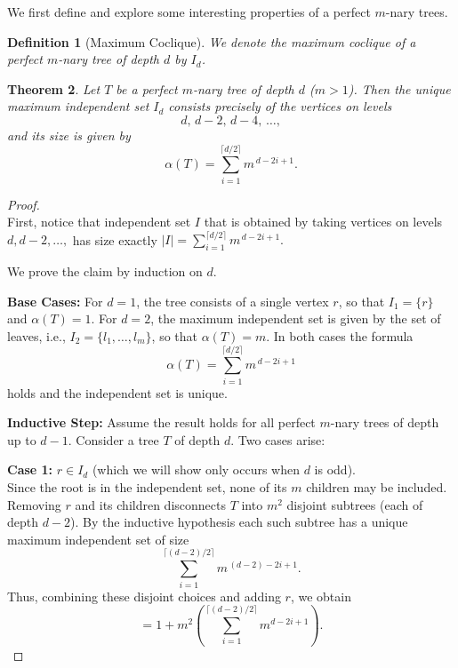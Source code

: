\documentclass[10pt]{amsart}
\newtheorem{theorem}{Theorem}[section]
\newtheorem{definition}[theorem]{Definition}
\theoremstyle{definition}
\begin{document}
We first define and explore some interesting properties of a perfect $m$-nary trees.

\begin{definition}[Maximum Coclique]
	We denote the maximum coclique of a perfect $m$-nary tree of depth $d$ by $I_d$.
\end{definition}


\begin{theorem}{\label{theorem:mnary_independence_num}}
	Let $T$ be a perfect $m$-nary tree of depth $d$ ($m>1$). Then the unique maximum independent set $I_d$ consists precisely of the vertices on levels
	\[
		d,\, d-2,\, d-4,\, \dots,
	\]
	and its size is given by
	\[
		\alpha(T)=\sum_{i=1}^{\lceil d/2 \rceil} m^{\,d-2i+1}.
	\]
\end{theorem}

\begin{proof}
	$ $
	\\
	First, notice that independent set $I$ that is obtained by taking vertices on levels $d, d-2, \ldots, $ has size exactly $|I|=\displaystyle{\sum_{i=1}^{\lceil d/2 \rceil} m^{\,d-2i+1}}.$

	We prove the claim by induction on $d$.

	\textbf{Base Cases:}
	For $d=1$, the tree consists of a single vertex $r$, so that $I_1=\{r\}$ and $\alpha(T)=1$. For $d=2$, the maximum independent set is given by the set of leaves, i.e., $I_2=\{l_1,\dots,l_m\}$, so that $\alpha(T)=m$. In both cases the formula
	\[
		\alpha(T)=\sum_{i=1}^{\lceil d/2 \rceil} m^{\,d-2i+1}
	\]
	holds and the independent set is unique.

	\medskip

	\textbf{Inductive Step:}
	Assume the result holds for all perfect $m$-nary trees of depth up to $d - 1$. Consider a tree $T$ of depth $d$. Two cases arise:

	\medskip

	\textbf{Case 1:} $r\in I_{d}$ (which we will show only occurs when $d$ is odd).\\[1mm]
	Since the root is in the independent set, none of its $m$ children may be included. Removing $r$ and its children disconnects $T$ into $m^2$ disjoint subtrees (each of depth $d-2$). By the inductive hypothesis each such subtree has a unique maximum independent set of size
	\[
		\sum_{i=1}^{\lceil (d-2)/2 \rceil} m^{\, (d-2)-2i+1}.
	\]
	Thus, combining these disjoint choices and adding $r$, we obtain
	\[
		= 1 + m^2\left(\sum_{i=1}^{\lceil (d-2)/2 \rceil} m^{d-2i+1}\right).
	\]


\end{proof}
\end{document}
